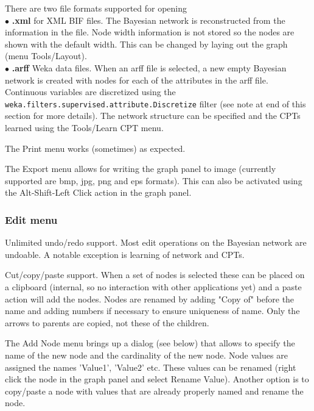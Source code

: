 There are two file formats supported for opening\\
$\bullet$ {\bf .xml} for XML BIF files. The Bayesian network is reconstructed
from the information in the file. Node width information is not stored so the nodes
are shown with the default width. This can be changed by laying out the graph
(menu Tools/Layout).\\
$\bullet$ {\bf .arff} Weka data files. When an arff file is selected, a new
empty Bayesian network is created with nodes for each of the attributes
in the arff file. Continuous variables are discretized using the 
{\tt weka.filters.supervised.attribute.Discretize} filter (see note at end of
this section for more details). The network
structure can be specified and the CPTs learned using the Tools/Learn CPT
menu.

The Print menu works (sometimes) as expected.

The Export menu allows for writing the graph panel to image (currently
supported are bmp, jpg, png and eps formats). This can also be activated
using the Alt-Shift-Left Click action in the graph panel.

\subsubsection*{Edit menu}

\begin{center}
\end{center}

Unlimited undo/redo support. Most edit operations on the Bayesian network
are undoable. A notable exception is learning of network and CPTs.

Cut/copy/paste support. When a set of nodes is selected these can be placed on
a clipboard (internal, so no interaction with other applications yet) and
a paste action will add the nodes. Nodes are renamed by adding "Copy of" before
the name and adding numbers if necessary to ensure uniqueness of name.
Only the arrows to parents are copied, not these of the children.

The Add Node menu brings up a dialog (see below) that allows to specify the name of the
new node and the cardinality of the new node. Node values are assigned the
names 'Value1', 'Value2' etc. These values can be renamed (right click the node
in the graph panel and select Rename Value). Another option is to copy/paste
a node with values that are already properly named and rename the node.

